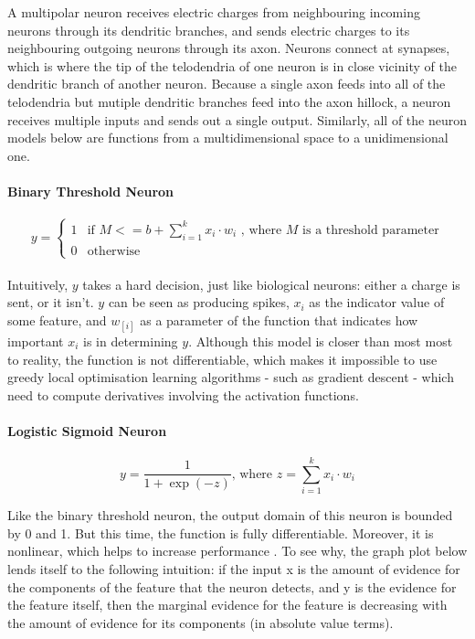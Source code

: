 \documentclass[a4paper,11pt]{article}
\begin{document}
A multipolar neuron receives electric charges from neighbouring incoming neurons through its dendritic branches, and sends electric charges to its neighbouring outgoing neurons through its axon. Neurons connect at synapses, which is where the tip of the telodendria of one neuron is in close vicinity of the dendritic branch of another neuron. Because a single axon feeds into all of the telodendria but mutiple dendritic branches feed into the axon hillock, a neuron receives multiple inputs and sends out a single output. Similarly, all of the neuron models below are functions from a multidimensional space to a unidimensional one.\\

\paragraph{Binary Threshold Neuron}
\begin{equation}
y = \begin{cases} 1 & \mbox{if } M <= b + \sum\limits_{i=1}^k x_{i}\cdot w_{i}  \text{ , where } M \text{ is a threshold parameter} \\ 
				  0 & \mbox{otherwise} \end{cases}
\end{equation} \\

Intuitively, $y$ takes a hard decision, just like biological neurons: either a charge is sent, or it isn't. $y$ can be seen as producing spikes, $x_{i}$ as the indicator value of some feature, and $w_[i]$ as a parameter of the function that indicates how important $x_{i}$ is in determining $y$. Although this model is closer than most most to reality, the function is not differentiable, which makes it impossible to use greedy local optimisation learning algorithms - such as gradient descent - which need to compute derivatives involving the activation functions.

\paragraph{Logistic Sigmoid Neuron} 
\begin{equation}
\label{sigmoid neuron}
y = \frac{1}{1 + \exp(-z)} \text{, where } z = \sum\limits_{i=1}^k x_{i}\cdot w_{i}
\end{equation}

Like the binary threshold neuron, the output domain of this neuron is bounded by 0 and 1. But this time, the function is fully differentiable. Moreover, it is nonlinear, which helps to increase performance \cite{DL-book}. To see why, the graph plot below lends itself to the following intuition: if the input x is the amount of evidence for the components of the feature that the neuron detects, and y is the evidence for the feature itself, then the marginal evidence for the feature is decreasing with the amount of evidence for its components (in absolute value terms). 
\end{document}

